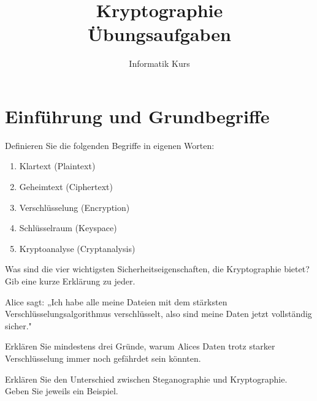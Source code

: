\documentclass[11pt,a4paper]{report}
\title{Kryptographie\\Übungsaufgaben}
\author{Informatik Kurs}
\date{}
\begin{document}



\section{Einführung und Grundbegriffe}

\begin{ex}
Definieren Sie die folgenden Begriffe in eigenen Worten:
\begin{enumerate}[label=\alph*)]
    \item Klartext (Plaintext)
    \item Geheimtext (Ciphertext)
    \item Verschlüsselung (Encryption)
    \item Schlüsselraum (Keyspace)
    \item Kryptoanalyse (Cryptanalysis)
\end{enumerate}
\end{ex}

\begin{ex}
Was sind die vier wichtigsten Sicherheitseigenschaften, die Kryptographie bietet? Gib eine kurze Erklärung zu jeder.
\end{ex}

\begin{ex}
Alice sagt: „Ich habe alle meine Dateien mit dem stärksten Verschlüsselungsalgorithmus verschlüsselt, also sind meine Daten jetzt vollständig sicher."

Erklären Sie mindestens drei Gründe, warum Alices Daten trotz starker Verschlüsselung immer noch gefährdet sein könnten.
\end{ex}

\begin{ex}
Erklären Sie den Unterschied zwischen Steganographie und Kryptographie. Geben Sie jeweils ein Beispiel.
\end{ex}
\end{document}
